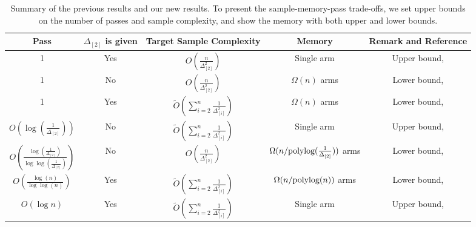 \begin{table}[!h]
	\centering
	\begin{tabular}{@{}c|c|c|c|c@{}}
		\toprule
		Pass & $\Delta_{[2]}$ is given & Target Sample Complexity & Memory & Remark and Reference\\ \midrule
		1 & Yes & $O(\frac{n}{\Delta^2_{[2]}})$  & Single arm & Upper bound, \cite{AssadiW20}  \\
		1 & No & $O(\frac{n}{\Delta^2_{[2]}})$  & $\Omega(n)$ arms & Lower bound, \cite{AWneurips22} \\
		1 & Yes & $\tilde{O}(\sum_{i=2}^{n}\frac{1}{\Delta^2_{[i]}})$  &  $\Omega(n)$ arms & Lower bound, \cite{AWneurips22} \\
		$O(\log(\frac{1}{\Delta_{[2]}}))$ & No & $\tilde{O}(\sum_{i=2}^{n}\frac{1}{\Delta^2_{[i]}})$ & Single arm & Upper bound, \cite{JinH0X21} \\
		$O(\frac{\log(\frac{1}{\Delta_{[2]}})}{\log\log(\frac{1}{\Delta_{[2]}})})$ & No & $O(\frac{n}{\Delta^2_{[2]}})$ & $\Omega(n/\textnormal{polylog}(\frac{1}{\Delta_{[2]}}))$ arms & Lower bound, \cite{AW23BestArm} \\
		$O(\frac{\log(n)}{\log\log(n)})$ & Yes & $\tilde{O}(\sum_{i=2}^{n}\frac{1}{\Delta^2_{[i]}})$ & $\Omega(n/\textnormal{polylog}(n))$ arms & Lower bound, \Cref{rst:main-lb} \\
		$O(\log{n})$ & Yes & $\tilde{O}(\sum_{i=2}^{n}\frac{1}{\Delta^2_{[i]}})$ & Single arm & Upper bound, \Cref{rst:main-ub} \\
		 \bottomrule
	\end{tabular}
	\caption{\label{tab:results-comparison}Summary of the previous results and our new results. To present the sample-memory-pass trade-offs, we set upper bounds on the number of passes and sample complexity, and show the memory with both upper and lower bounds. 
	}
\end{table}





